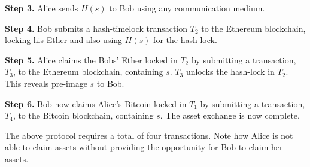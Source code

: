 \textbf{Step 3.} Alice sends $ H(s) $ to Bob using any communication medium.

\textbf{Step 4.} Bob submits a hash-timelock transaction $ T_2 $ to the Ethereum blockchain, locking his Ether and also using $ H(s) $ for the hash lock.

\textbf{Step 5.} Alice claims the Bobs' Ether locked in $ T_2 $ by submitting a transaction, $ T_3 $, to the Ethereum blockchain, containing $ s $. $ T_3 $ unlocks the hash-lock in $ T_2 $. This reveals pre-image $ s $ to Bob.

\textbf{Step 6.} Bob now claims Alice's Bitcoin locked in $ T_1 $ by submitting a transaction, $ T_4 $, to the Bitcoin blockchain, containing $ s $. The asset exchange is now complete.

The above protocol requires a total of four transactions.
Note how Alice is not able to claim assets without providing the opportunity for Bob to claim her assets.


